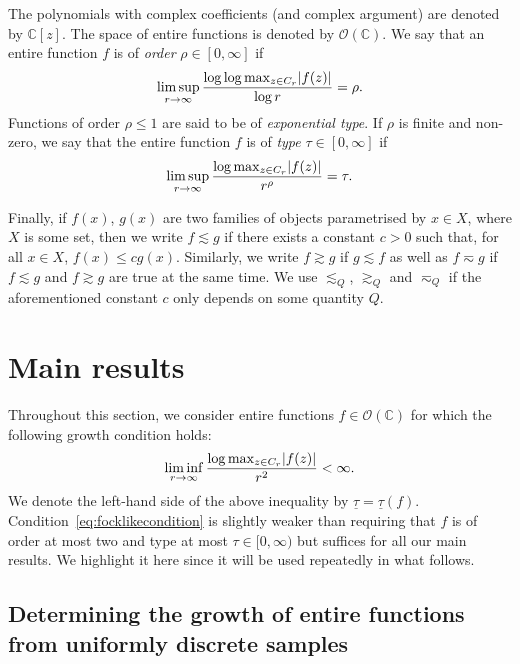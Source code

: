 \documentclass{article}
\newcommand{\bbC}{\mathbb{C}}
\newcommand{\calO}{\mathcal{O}}
\DeclarePairedDelimiter{\abs}{\lvert}{\rvert}
\theoremstyle{remark}
\begin{document}
    The polynomials with complex coefficients (and complex argument) are denoted by $\bbC[z]$. The space of entire functions is denoted by $\calO(\bbC)$. We say that an entire function $f$ is of \emph{order} $\rho \in [0,\infty]$ if 
    \begin{equation*}
        \limsup_{r \to \infty} \frac{\log \log \max_{z \in C_r} \abs{f(z)}}{\log r} = \rho.
    \end{equation*}
    Functions of order $\rho \leq 1$ are said to be of \emph{exponential type}. If $\rho$ is finite and non-zero, we say that the entire function $f$ is of \emph{type} $\tau \in [0,\infty]$ if 
    \begin{equation*}
        \limsup_{r \to \infty} \frac{\log \max_{z \in C_r} \abs{f(z)}}{r^\rho} = \tau.
    \end{equation*}

    Finally, if $f(x)$, $g(x)$ are two families of objects parametrised by $x \in X$, where $X$ is some set, then we write $f \lesssim g$ if there exists a constant $c > 0$ such that, for all $x \in X$, $f(x) \leq c g(x)$. Similarly, we write $f \gtrsim g$ if $g \lesssim f$ as well as $f \eqsim g$ if $f \lesssim g$ and $f \gtrsim g$ are true at the same time. We use $\lesssim_Q$, $\gtrsim_Q$ and $\eqsim_Q$ if the aforementioned constant $c$ only depends on some quantity $Q$.

    \section{Main results}

    Throughout this section, we consider entire functions $f \in \calO(\bbC)$ for which the following growth condition holds:
    \begin{equation}
        \liminf_{r \to \infty} \frac{\log \max_{z \in C_r} \abs{f(z)}}{r^2} < \infty. \label{eq:focklikecondition}
    \end{equation}
    We denote the left-hand side of the above inequality by $\underline \tau = \underline \tau(f)$. Condition~\eqref{eq:focklikecondition} is slightly weaker than requiring that $f$ is of order at most two and type at most $\tau \in [0,\infty)$ but suffices for all our main results. We highlight it here since it will be used repeatedly in what follows.

    \subsection{Determining the growth of entire functions from uniformly discrete samples}
\end{document}
